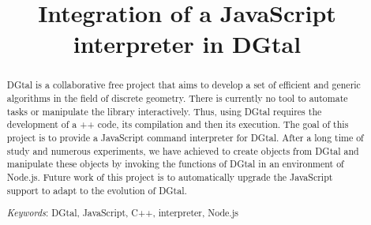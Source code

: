 \documentclass[11pt, english, screen, research-development]{report-rd-info}
\begin{document}
\title{Integration of a JavaScript interpreter in DGtal}

 

\begin{abstract}
DGtal is a collaborative free project that aims to develop a set of efficient and generic algorithms in the field of discrete geometry. There is currently no tool to automate tasks or manipulate the library interactively. Thus, using DGtal requires the development of a ++ code, its compilation and then its execution. The goal of this project is to provide a JavaScript command interpreter for DGtal. After a long time of study and numerous experiments, we have achieved to create objects from DGtal and manipulate these objects by invoking the functions of DGtal in an environment of Node.js. Future work of this project is to automatically upgrade the JavaScript support to adapt to the evolution of DGtal.


\textit{Keywords}: DGtal, JavaScript, C++, interpreter, Node.js
    \begin{comment}
    
   As the name suggests, the abstract is a very short but informative piece of information about everything you did in this work, i.e., successively the description of the problem at hand, the objectives, the main point of the state-of-the-art, the choices made, the conceptual developments, the conducted experiments, results and interpretations, the new issues.

   It is the last thing to write!
   (Do not provide any details, give popular scientific information.  The introduction and conclusion of the report are there to develop the overall ideas.)
   \end{comment}
\end{abstract}
\end{document}
